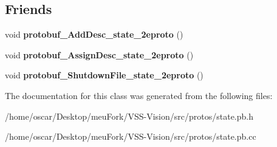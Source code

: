 \subsection*{Friends}
\begin{DoxyCompactItemize}
\item 
\hypertarget{classvss__state_1_1Global__State_aab1a2c258f8122a403a979ff57e2a706}{void {\bfseries protobuf\-\_\-\-Add\-Desc\-\_\-state\-\_\-2eproto} ()}\label{classvss__state_1_1Global__State_aab1a2c258f8122a403a979ff57e2a706}

\item 
\hypertarget{classvss__state_1_1Global__State_a57d9367bc8a7a94ead11d11194cca1b6}{void {\bfseries protobuf\-\_\-\-Assign\-Desc\-\_\-state\-\_\-2eproto} ()}\label{classvss__state_1_1Global__State_a57d9367bc8a7a94ead11d11194cca1b6}

\item 
\hypertarget{classvss__state_1_1Global__State_a4e6dc5e8e72799859c4e9556d090e57d}{void {\bfseries protobuf\-\_\-\-Shutdown\-File\-\_\-state\-\_\-2eproto} ()}\label{classvss__state_1_1Global__State_a4e6dc5e8e72799859c4e9556d090e57d}

\end{DoxyCompactItemize}


The documentation for this class was generated from the following files\-:\begin{DoxyCompactItemize}
\item 
/home/oscar/\-Desktop/meu\-Fork/\-V\-S\-S-\/\-Vision/src/protos/state.\-pb.\-h\item 
/home/oscar/\-Desktop/meu\-Fork/\-V\-S\-S-\/\-Vision/src/protos/state.\-pb.\-cc\end{DoxyCompactItemize}
